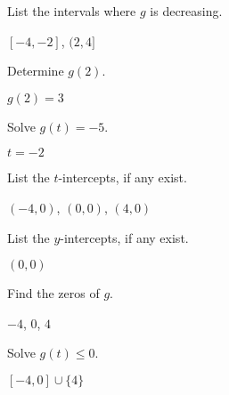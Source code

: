 \documentclass{ximera}
\begin{document}
\begin{question}
List the intervals where $g$ is decreasing.

\begin{solution}
$[-4, -2]$, $(2,4]$
\end{solution}

\end{question}

\begin{question}
Determine $g(2)$.
\begin{solution}
$g(2) = 3$

\end{solution}

\end{question}

\begin{question}
Solve $g(t) = -5$.

\begin{solution}
$t=-2$
\end{solution}

\end{question}

\begin{question}
List the $t$-intercepts, if any exist.
\begin{solution}
$(-4,0)$, $(0,0)$, $(4,0)$
\end{solution}

\end{question}

\begin{question}
List the $y$-intercepts, if any exist.

\begin{solution}
$(0,0)$

\end{solution}

\end{question}

\begin{question}
Find the zeros of $g$.
\begin{solution}
$-4$, $0$, $4$
\end{solution}

\end{question}

\begin{question}
Solve $g(t) \leq 0$.

\begin{solution}
$[-4,0] \cup \{4\}$
\end{solution}

\end{question}
\end{document}
